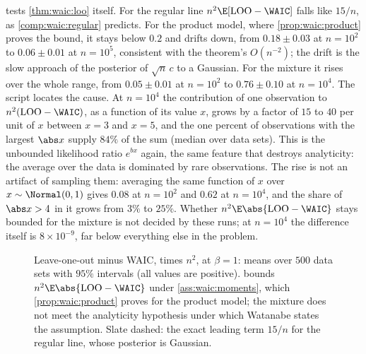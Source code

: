 \begin{refsection}
 tests \cref{thm:waic:loo} itself. For the regular line $n^2\E[\waicLOO-\WAIC]$ falls like $15/n$, as \cref{comp:waic:regular} predicts. For the product model, where \cref{prop:waic:product} proves the bound, it stays below $0.2$ and drifts down, from $0.18\pm0.03$ at $n=10^2$ to $0.06\pm0.01$ at $n=10^5$, consistent with the theorem's $O(n^{-2})$; the drift is the slow approach of the posterior of $\sqrt n\,c$ to a Gaussian. For the mixture it rises over the whole range, from $0.05\pm0.01$ at $n=10^2$ to $0.76\pm0.10$ at $n=10^4$. The script locates the cause. At $n=10^4$ the contribution of one observation to $n^2(\waicLOO-\WAIC)$, as a function of its value $x$, grows by a factor of $15$ to $40$ per unit of $x$ between $x=3$ and $x=5$, and the one percent of observations with the largest $\abs x$ supply $84\%$ of the sum (median over data sets). This is the unbounded likelihood ratio $e^{bx}$ again, the same feature that destroys analyticity: the average over the data is dominated by rare observations. The rise is not an artifact of sampling them: averaging the same function of $x$ over $x\sim\Normal(0,1)$ gives $0.08$ at $n=10^2$ and $0.62$ at $n=10^4$, and the share of $\abs x>4$ in it grows from $3\%$ to $25\%$. Whether $n^2\E\abs{\waicLOO-\WAIC}$ stays bounded for the mixture is not decided by these runs; at $n=10^4$ the difference itself is $8\times10^{-9}$, far below everything else in the problem.

\begin{figure}[t]
\centering
{}
\caption{Leave-one-out minus WAIC, times $n^2$, at $\beta=1$: means over $500$ data sets with $95\%$ intervals (all values are positive).  bounds $n^2\E\abs{\waicLOO-\WAIC}$ under \cref{ass:waic:moments}, which \cref{prop:waic:product} proves for the product model; the mixture does not meet the analyticity hypothesis under which Watanabe states the assumption. Slate dashed: the exact leading term $15/n$ for the regular line, whose posterior is Gaussian.}\label{fig:waic:loo}
\end{figure}


\end{refsection}

